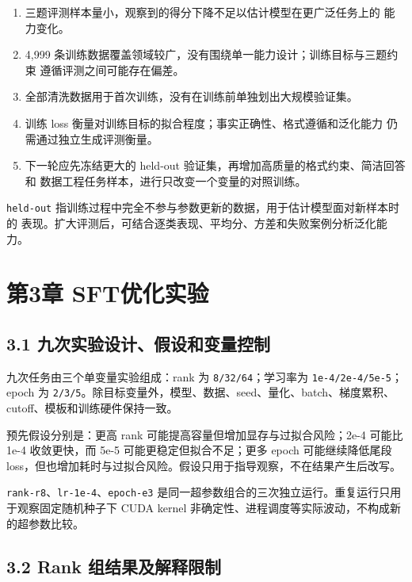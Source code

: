 \documentclass[UTF8,fontset=fandol,a4paper,11pt]{ctexart}
\providecommand{\tightlist}{\setlength{\itemsep}{0pt}\setlength{\parskip}{0pt}}
\begin{document}
\begin{enumerate}
\def\labelenumi{\arabic{enumi}.}
\tightlist
\item
  三题评测样本量小，观察到的得分下降不足以估计模型在更广泛任务上的
  能力变化。
\item
  4,999 条训练数据覆盖领域较广，没有围绕单一能力设计；训练目标与三题约束
  遵循评测之间可能存在偏差。
\item
  全部清洗数据用于首次训练，没有在训练前单独划出大规模验证集。
\item
  训练 loss 衡量对训练目标的拟合程度；事实正确性、格式遵循和泛化能力
  仍需通过独立生成评测衡量。
\item
  下一轮应先冻结更大的 held-out
  验证集，再增加高质量的格式约束、简洁回答和
  数据工程任务样本，进行只改变一个变量的对照训练。
\end{enumerate}

\nolinkurl{held-out}
指训练过程中完全不参与参数更新的数据，用于估计模型面对新样本时的
表现。扩大评测后，可结合逐类表现、平均分、方差和失败案例分析泛化能力。

\section{第3章
SFT优化实验}\label{ux7b2c3ux7ae0-sftux4f18ux5316ux5b9eux9a8c}

\subsection{3.1 九次实验设计、假设和变量控制}\label{ux4e5dux6b21ux5b9eux9a8cux8bbeux8ba1ux5047ux8bbeux548cux53d8ux91cfux63a7ux5236}

九次任务由三个单变量实验组成：rank 为 {\nolinkurl{8/32/64}；学习率为}
{\nolinkurl{1e-4/2e-4/5e-5}；epoch} 为
{\nolinkurl{2/3/5}。除目标变量外，模型、数据、seed、量化、batch、梯度累积、cutoff、模板和训练硬件保持一致。}

预先假设分别是：更高 rank 可能提高容量但增加显存与过拟合风险；2e-4
可能比 1e-4 收敛更快，而 5e-5 可能更稳定但拟合不足；更多 epoch
可能继续降低尾段
loss，但也增加耗时与过拟合风险。假设只用于指导观察，不在结果产生后改写。

\nolinkurl{rank-r8}、\nolinkurl{lr-1e-4}、\nolinkurl{epoch-e3}
是同一超参数组合的三次独立运行。重复运行只用于观察固定随机种子下 CUDA
kernel 非确定性、进程调度等实际波动，不构成新的超参数比较。

\subsection{3.2 Rank 组结果及解释限制}\label{rank-ux7ec4ux7ed3ux679cux53caux89e3ux91caux9650ux5236}
\end{document}
